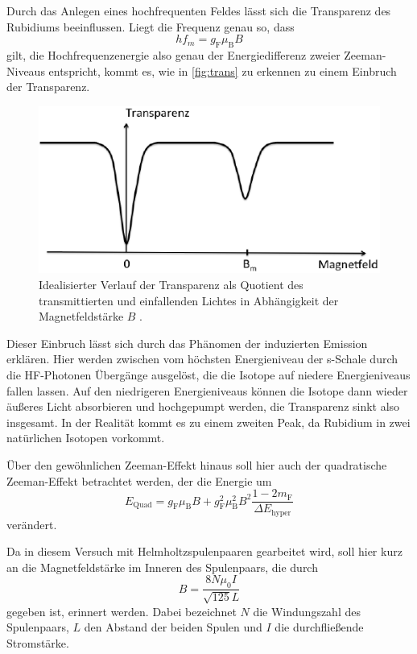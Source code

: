Durch das Anlegen eines hochfrequenten Feldes lässt sich die Transparenz des Rubidiums beeinflussen.
Liegt die Frequenz genau so, dass
\begin{equation}
    h f_m = g_\text{F} \mu_\text{B} B
    \label{eq:HFFeld}
\end{equation}
gilt, die Hochfrequenzenergie also genau der Energiedifferenz zweier Zeeman-Niveaus entspricht, kommt es, wie in \autoref{fig:trans} zu erkennen zu einem Einbruch der Transparenz.
\begin{figure}[H]
    \centering
    \includegraphics{figures/Transparenz.pdf}
    \caption{Idealisierter Verlauf der Transparenz als Quotient des transmittierten und einfallenden Lichtes in Abhängigkeit der Magnetfeldstärke $B$ \cite{v21}.}
    \label{fig:trans}
\end{figure}
Dieser Einbruch lässt sich durch das Phänomen der induzierten Emission erklären.
Hier werden zwischen vom höchsten Energieniveau der s-Schale durch die HF-Photonen Übergänge ausgelöst, die die Isotope auf niedere Energieniveaus fallen lassen.
Auf den niedrigeren Energieniveaus können die Isotope dann wieder äußeres Licht absorbieren und hochgepumpt werden, die Transparenz sinkt also insgesamt.
In der Realität kommt es zu einem zweiten Peak, da Rubidium in zwei natürlichen Isotopen vorkommt.

Über den gewöhnlichen Zeeman-Effekt hinaus soll hier auch der quadratische Zeeman-Effekt betrachtet werden, der die Energie um
\begin{equation}
    E_\text{Quad} = g_\text{F} \mu_\text{B} B + g^2_\text{F} \mu^2_\text{B} B^2 \frac{1 - 2 m_\text{F}}{\Delta E_\text{hyper}}
    \label{eq:QuadZee}
\end{equation}
verändert.

Da in diesem Versuch mit Helmholtzspulenpaaren gearbeitet wird, soll hier kurz an die Magnetfeldstärke im Inneren des Spulenpaars, die durch
\begin{equation}
    B = \frac{8 N \mu_0 I}{\sqrt{125} L} 
    \label{eq:Magnetfeld_Helmholtz}
\end{equation}
gegeben ist, erinnert werden.
Dabei bezeichnet $N$ die Windungszahl des Spulenpaars, $L$ den Abstand der beiden Spulen und $I$ die durchfließende Stromstärke.